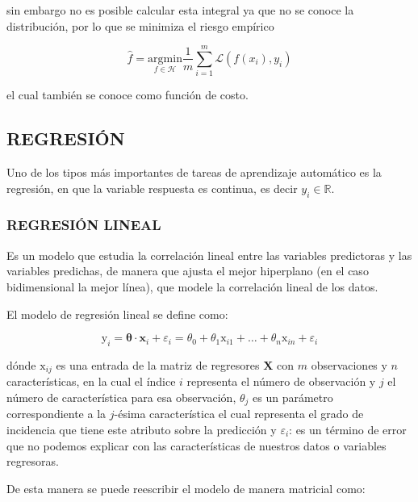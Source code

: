         \noindent sin embargo no es posible calcular esta integral ya que no se conoce la distribución, por lo que se minimiza el riesgo empírico
        
        \begin{equation}
            \hat{f} = \underset{f \in \mathcal{H}}{\text{argmin}} \frac{1}{m} \sum_{i=1}^m \mathcal{L}(f(x_i), y_i)
        \end{equation}
        
        \noindent el cual también se conoce como función de costo. \citep{10.5555/3360093}
        
    \subsection{REGRESIÓN}
        Uno de los tipos más importantes de tareas de aprendizaje automático es la regresión, en que la variable respuesta es continua, es decir $y_i \in \mathbb{R}$.
        \subsubsection{REGRESIÓN LINEAL}
        Es un modelo que estudia la correlación lineal entre las variables predictoras y las variables predichas, de manera que ajusta el mejor hiperplano (en el caso bidimensional la mejor línea), que modele la correlación lineal de los datos. \citep{gujarati2003basic}
        
        El modelo de regresión lineal se define como:
        
        \begin{equation}
            \mathrm{y}_i = \mathbf{\theta}\cdot\mathbf{x}_i + \varepsilon_i = \theta_0 + \theta_1\mathrm{x}_{i1} + \dots + \theta_n\mathrm{x}_{i n} + \varepsilon_i
        \end{equation}
        
        dónde $\mathrm{x}_{i j}$ es una entrada de la matriz de regresores $\mathbf{X}$ con $m$ observaciones y $n$ características, en la cual el índice $i$ representa el número de observación y $j$ el número de característica para esa observación, $\theta_j$ es un parámetro correspondiente a la $j$-ésima característica el cual representa el grado de incidencia que tiene este atributo sobre la predicción y $\varepsilon_i$: es un término de error que no podemos explicar con las características de nuestros datos o variables regresoras.
        
        \noindent De esta manera se puede reescribir el modelo de manera matricial como:
        
